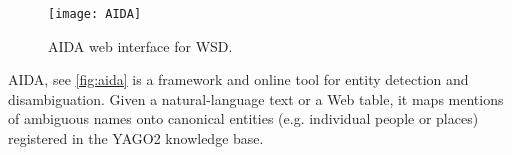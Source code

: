 \begin{figure}[htb]
    \centering
    \texttt{[image: AIDA]}
    \caption{AIDA web interface for \acs{WSD}.}
    \label{fig:aida}
\end{figure}

\noindent AIDA, see \autoref{fig:aida} is a framework and online tool for entity detection and disambiguation.
Given a natural-language text or a Web table, it maps mentions of ambiguous names onto
canonical entities (e.g. individual people or places) registered in the YAGO2
knowledge base. 